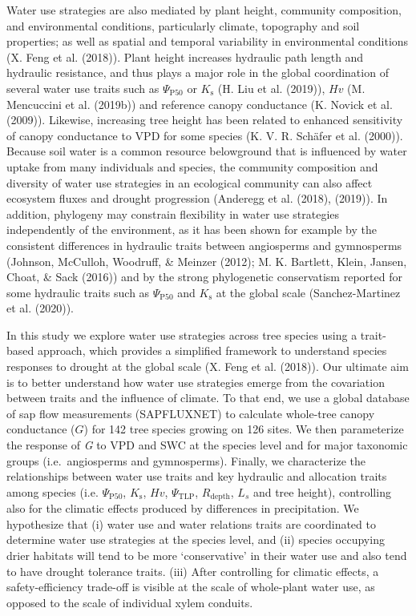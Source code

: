 \documentclass[11pt,twoside]{reedthesis}
\begin{document}
Water use strategies are also mediated by plant height, community
composition, and environmental conditions, particularly climate,
topography and soil properties; as well as spatial and temporal
variability in environmental conditions (X. Feng et al. (2018)). Plant
height increases hydraulic path length and hydraulic resistance, and
thus plays a major role in the global coordination of several water use
traits such as \(\Psi_{\text{P50}}\) or \(K_\text{s}\) (H. Liu et al.
(2019)), \(Hv\) (M. Mencuccini et al. (2019b)) and reference canopy
conductance (K. Novick et al. (2009)). Likewise, increasing tree height
has been related to enhanced sensitivity of canopy conductance to VPD
for some species (K. V. R. Schäfer et al. (2000)). Because soil water is
a common resource belowground that is influenced by water uptake from
many individuals and species, the community composition and diversity of
water use strategies in an ecological community can also affect
ecosystem fluxes and drought progression (Anderegg et al. (2018),
(2019)). In addition, phylogeny may constrain flexibility in water use
strategies independently of the environment, as it has been shown for
example by the consistent differences in hydraulic traits between
angiosperms and gymnosperms (Johnson, McCulloh, Woodruff, \& Meinzer
(2012); M. K. Bartlett, Klein, Jansen, Choat, \& Sack (2016)) and by the
strong phylogenetic conservatism reported for some hydraulic traits such
as \(\Psi_{\text{P50}}\) and \(K_\text{s}\) at the global scale
(Sanchez-Martinez et al. (2020)).\par

In this study we explore water use strategies across tree species using
a trait-based approach, which provides a simplified framework to
understand species responses to drought at the global scale (X. Feng et
al. (2018)). Our ultimate aim is to better understand how water use
strategies emerge from the covariation between traits and the influence
of climate. To that end, we use a global database of sap flow
measurements (SAPFLUXNET) to calculate whole-tree canopy conductance
(\(G\)) for 142 tree species growing on 126 sites. We then parameterize
the response of \emph{G} to VPD and SWC at the species level and for
major taxonomic groups (i.e.~angiosperms and gymnosperms). Finally, we
characterize the relationships between water use traits and key
hydraulic and allocation traits among species (i.e.
\(\Psi_{\text{P50}}\), \(K_\text{s}\), \(Hv\), \(\Psi_{\text{TLP}}\),
\(R_{\text{depth}}\), \(L_s\) and tree height), controlling also for the
climatic effects produced by differences in precipitation. We
hypothesize that (i) water use and water relations traits are
coordinated to determine water use strategies at the species level, and
(ii) species occupying drier habitats will tend to be more
`conservative' in their water use and also tend to have drought
tolerance traits. (iii) After controlling for climatic effects, a
safety-efficiency trade-off is visible at the scale of whole-plant water
use, as opposed to the scale of individual xylem conduits.\par
\end{document}
